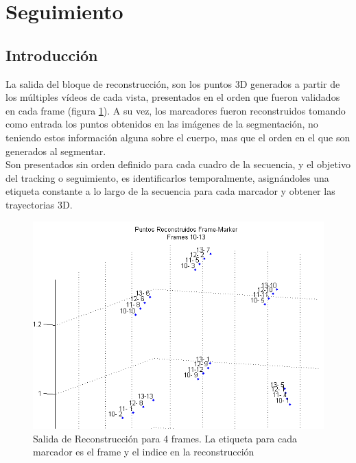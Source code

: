 \section{Seguimiento}

\subsection{Introducción}

La salida del bloque de reconstrucción, son los puntos 3D generados a partir de los múltiples vídeos de cada vista, presentados en el orden que fueron validados en cada frame (figura \ref{reconstr_00}). A su vez, los marcadores fueron reconstruidos tomando como entrada los puntos obtenidos en las imágenes de la segmentación, no teniendo estos información alguna sobre el cuerpo, mas que el orden en el que son generados al segmentar.
\\ 

Son presentados sin orden definido para cada cuadro de la secuencia, y el objetivo del tracking o seguimiento, es identificarlos temporalmente, asignándoles una etiqueta constante a lo largo de la secuencia para cada marcador y obtener las trayectorias 3D.

\begin{figure}[hbt]
\begin{center}
\includegraphics[scale=0.8]{img/Tracking/00_Salida_Reconstruccion.png}
\end{center}
\caption{Salida de Reconstrucción para 4 frames. La etiqueta para cada marcador es el frame y el indice en la reconstrucción}
\label{reconstr_00}
\end{figure}

